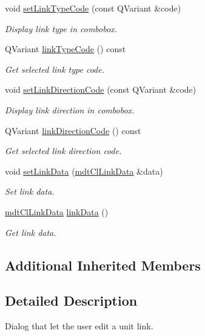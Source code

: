 \begin{DoxyCompactItemize}
void \hyperlink{classmdt_cl_unit_link_dialog_a34ab2fabffeb5b889be8db9ac08add22}{set\-Link\-Type\-Code} (const Q\-Variant \&code)
\begin{DoxyCompactList}\small\item\em Display link type in combobox. \end{DoxyCompactList}\item 
Q\-Variant \hyperlink{classmdt_cl_unit_link_dialog_aa7d8b93582d68113b6d00922e4979e78}{link\-Type\-Code} () const 
\begin{DoxyCompactList}\small\item\em Get selected link type code. \end{DoxyCompactList}\item 
void \hyperlink{classmdt_cl_unit_link_dialog_a23220c3ea0f051e9155ee9a2a052b5ea}{set\-Link\-Direction\-Code} (const Q\-Variant \&code)
\begin{DoxyCompactList}\small\item\em Display link direction in combobox. \end{DoxyCompactList}\item 
Q\-Variant \hyperlink{classmdt_cl_unit_link_dialog_a4ed022bb559da23be2d192b9e83c40e2}{link\-Direction\-Code} () const 
\begin{DoxyCompactList}\small\item\em Get selected link direction code. \end{DoxyCompactList}\item 
void \hyperlink{classmdt_cl_unit_link_dialog_a43ee4d2a395f42dcaa2667170e5ad0bc}{set\-Link\-Data} (\hyperlink{classmdt_cl_link_data}{mdt\-Cl\-Link\-Data} \&data)
\begin{DoxyCompactList}\small\item\em Set link data. \end{DoxyCompactList}\item 
\hyperlink{classmdt_cl_link_data}{mdt\-Cl\-Link\-Data} \hyperlink{classmdt_cl_unit_link_dialog_a9553b27b636bec6af4139afa11a5a2db}{link\-Data} ()
\begin{DoxyCompactList}\small\item\em Get link data. \end{DoxyCompactList}\end{DoxyCompactItemize}
\subsection*{Additional Inherited Members}


\subsection{Detailed Description}
Dialog that let the user edit a unit link. 

